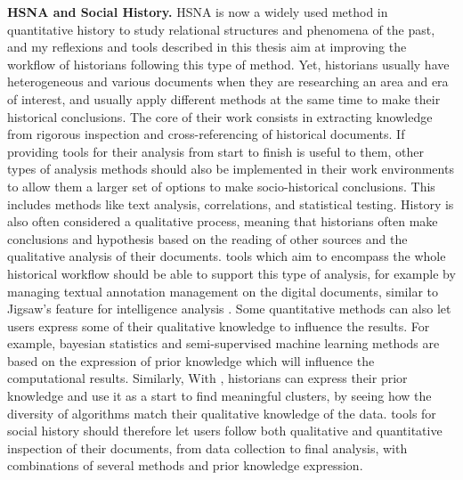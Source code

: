 \noindent\textbf{HSNA and Social History.} HSNA is now a widely used method in quantitative history to study relational structures and phenomena of the past\cite{kerschbaumerPowerNetworksProspects2015, petzCombiningNetworkResearch2022, wetherellHistoricalSocialNetwork1998}, and my reflexions and tools described in this thesis aim at improving the workflow of historians following this type of method.
Yet, historians usually have heterogeneous and various documents when they are researching an area and era of interest, and usually apply different methods at the same time to make their historical conclusions\cite{padgettRobustActionRise1993, petzCombiningNetworkResearch2022}.
The core of their work consists in extracting knowledge from rigorous inspection and cross-referencing of historical documents.
If providing \va tools for their \hsna analysis from start to finish is useful to them, other types of analysis methods should also be implemented in their work environments to allow them a larger set of options to make socio-historical conclusions.
This includes methods like text analysis, correlations, and statistical testing\cite{lemercierQuantitativeMethodsHumanities2019}.
History is also often considered a qualitative process, meaning that historians often make conclusions and hypothesis based on the reading of other sources and the qualitative analysis of their documents.
\va tools which aim to encompass the whole historical workflow should be able to support this type of analysis, for example by managing textual annotation management on the digital documents, similar to Jigsaw's feature for intelligence analysis \cite{staskoJigsawSupportingInvestigative2008}.
Some quantitative methods can also let users express some of their qualitative knowledge to influence the results.
For example, bayesian statistics and semi-supervised machine learning methods are based on the expression of prior knowledge which will influence the computational results.
Similarly, With \pkclustering, historians can express their prior knowledge and use it as a start to find meaningful clusters, by seeing how the diversity of algorithms match their qualitative knowledge of the data.
\va tools for social history should therefore let users follow both qualitative and quantitative inspection of their documents, from data collection to final analysis, with combinations of several methods and prior knowledge expression.


